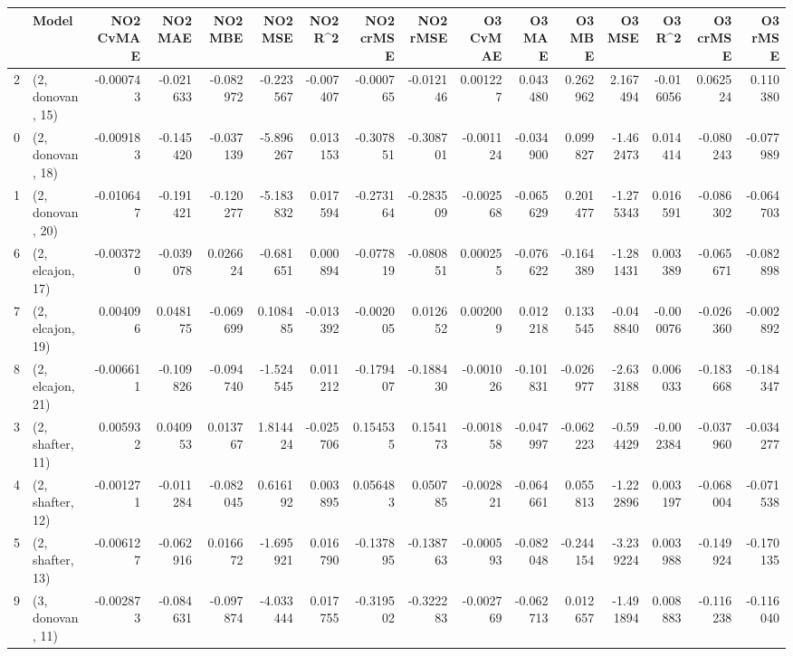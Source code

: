 \begin{tabular}{llrrrrrrrrrrrrrr}
\toprule
{} &             Model &  NO2 CvMAE &   NO2 MAE &   NO2 MBE &    NO2 MSE &   NO2 R\textasciicircum2 &  NO2 crMSE &  NO2 rMSE &  O3 CvMAE &    O3 MAE &    O3 MBE &     O3 MSE &    O3 R\textasciicircum2 &  O3 crMSE &   O3 rMSE \\
\midrule
2  &  (2, donovan, 15) &  -0.000743 & -0.021633 & -0.082972 &  -0.223567 & -0.007407 &  -0.000765 & -0.012146 &  0.001227 &  0.043480 &  0.262962 &   2.167494 & -0.016056 &  0.062524 &  0.110380 \\
0  &  (2, donovan, 18) &  -0.009183 & -0.145420 & -0.037139 &  -5.896267 &  0.013153 &  -0.307851 & -0.308701 & -0.001124 & -0.034900 &  0.099827 &  -1.462473 &  0.014414 & -0.080243 & -0.077989 \\
1  &  (2, donovan, 20) &  -0.010647 & -0.191421 & -0.120277 &  -5.183832 &  0.017594 &  -0.273164 & -0.283509 & -0.002568 & -0.065629 &  0.201477 &  -1.275343 &  0.016591 & -0.086302 & -0.064703 \\
6  &  (2, elcajon, 17) &  -0.003720 & -0.039078 &  0.026624 &  -0.681651 &  0.000894 &  -0.077819 & -0.080851 &  0.000255 & -0.076622 & -0.164389 &  -1.281431 &  0.003389 & -0.065671 & -0.082898 \\
7  &  (2, elcajon, 19) &   0.004096 &  0.048175 & -0.069699 &   0.108485 & -0.013392 &  -0.002005 &  0.012652 &  0.002009 &  0.012218 &  0.133545 &  -0.048840 & -0.000076 & -0.026360 & -0.002892 \\
8  &  (2, elcajon, 21) &  -0.006611 & -0.109826 & -0.094740 &  -1.524545 &  0.011212 &  -0.179407 & -0.188430 & -0.001026 & -0.101831 & -0.026977 &  -2.633188 &  0.006033 & -0.183668 & -0.184347 \\
3  &  (2, shafter, 11) &   0.005932 &  0.040953 &  0.013767 &   1.814424 & -0.025706 &   0.154535 &  0.154173 & -0.001858 & -0.047997 & -0.062223 &  -0.594429 & -0.002384 & -0.037960 & -0.034277 \\
4  &  (2, shafter, 12) &  -0.001271 & -0.011284 & -0.082045 &   0.616192 &  0.003895 &   0.056483 &  0.050785 & -0.002821 & -0.064661 &  0.055813 &  -1.222896 &  0.003197 & -0.068004 & -0.071538 \\
5  &  (2, shafter, 13) &  -0.006127 & -0.062916 &  0.016672 &  -1.695921 &  0.016790 &  -0.137895 & -0.138763 & -0.000593 & -0.082048 & -0.244154 &  -3.239224 &  0.003988 & -0.149924 & -0.170135 \\
9  &  (3, donovan, 11) &  -0.002873 & -0.084631 & -0.097874 &  -4.033444 &  0.017755 &  -0.319502 & -0.322283 & -0.002769 & -0.062713 &  0.012657 &  -1.491894 &  0.008883 & -0.116238 & -0.116040 \\

\end{tabular}
